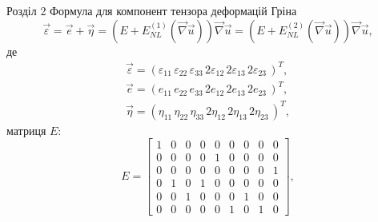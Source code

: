\documentclass[8pt]{beamer}
\numberwithin{figure}{section}
\numberwithin{equation}{section}
\numberwithin{table}{section}
\begin{document}
\begin{frame}{Розділ 2}
Формула для компонент тензора деформацій Гріна
\begin{equation}
\vec{\varepsilon}=\vec{e}+\vec{\eta}=\left(E + E_{NL}^{(1)} \left(\vec {\nabla} \vec{u} \right) \right)\vec {\nabla} \vec{u}=\left(E + E_{NL}^{(2)} \left(\vec {\nabla} \vec{u} \right) \right)\vec {\nabla} \vec{u},
\end{equation}
де 
\begin{align}
\vec{\varepsilon} = \left(
\varepsilon_{11}\,
\varepsilon_{22}\,
\varepsilon_{33}\,
2\varepsilon_{12}\,
2\varepsilon_{13}\,
2\varepsilon_{23}\,
\right)^T,\\
\vec{e} = \left( 
e_{11}\,
e_{22}\,
e_{33}\,
2e_{12}\,
2e_{13}\,
2e_{23}\,
\right)^T,\\
\vec{\eta} = \left( 
\eta_{11}\,
\eta_{22}\,
\eta_{33}\,
2\eta_{12}\,
2\eta_{13}\,
2\eta_{23}\,
\right)^T,
\end{align}
матриця $E$:
\begin{equation}
E=\left[\begin{matrix}1 & 0 & 0 & 0 & 0 & 0 & 0 & 0 & 0\\0 & 0 & 0 & 0 & 1 & 0 & 0 & 0 & 0\\0 & 0 & 0 & 0 & 0 & 0 & 0 & 0 & 1\\0 & 1 & 0 & 1 & 0 & 0 & 0 & 0 & 0\\0 & 0 & 1 & 0 & 0 & 0 & 1 & 0 & 0\\0 & 0 & 0 & 0 & 0 & 1 & 0 & 1 & 0\end{matrix}\right],
\end{equation}


\end{frame}
\end{document}
